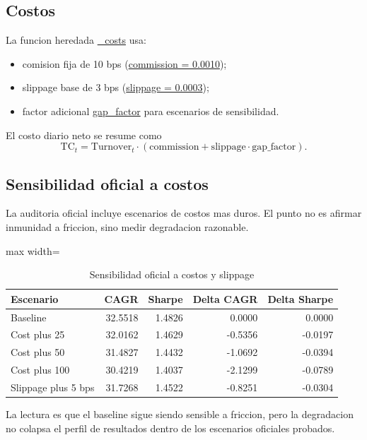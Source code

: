 \documentclass[11pt,letterpaper]{article}
\newcommand{\code}[1]{{\urlstyle{tt}\url{#1}}}
\begin{document}
\subsection{Costos}
La funcion heredada \code{\_costs} usa:
\begin{itemize}
    \item comision fija de 10 bps (\code{commission = 0.0010});
    \item slippage base de 3 bps (\code{slippage = 0.0003});
    \item factor adicional \code{gap\_factor} para escenarios de sensibilidad.
\end{itemize}

El costo diario neto se resume como
\begin{equation}
\mathrm{TC}_t
= \mathrm{Turnover}_t \cdot
\left(\mathrm{commission} + \mathrm{slippage}\cdot \mathrm{gap\_factor}\right).
\end{equation}

\subsection{Sensibilidad oficial a costos}
La auditoria oficial incluye escenarios de costos mas duros. El punto no es afirmar inmunidad a friccion, sino medir degradacion razonable.

\begin{table}[H]
\centering
\caption{Sensibilidad oficial a costos y slippage}
\label{tab:cost-sensitivity}
\begin{adjustbox}{max width=\textwidth}
\begin{tabular}{p{}rrrr}
\toprule
\textbf{Escenario} & \textbf{CAGR} & \textbf{Sharpe} & \textbf{Delta CAGR} & \textbf{Delta Sharpe} \\
\midrule
Baseline & 32.5518 & 1.4826 & 0.0000 & 0.0000 \\
Cost plus 25 & 32.0162 & 1.4629 & -0.5356 & -0.0197 \\
Cost plus 50 & 31.4827 & 1.4432 & -1.0692 & -0.0394 \\
Cost plus 100 & 30.4219 & 1.4037 & -2.1299 & -0.0789 \\
Slippage plus 5 bps & 31.7268 & 1.4522 & -0.8251 & -0.0304 \\
\bottomrule
\end{tabular}
\end{adjustbox}
\end{table}

La lectura es que el baseline sigue siendo sensible a friccion, pero la degradacion no colapsa el perfil de resultados dentro de los escenarios oficiales probados.
\end{document}
